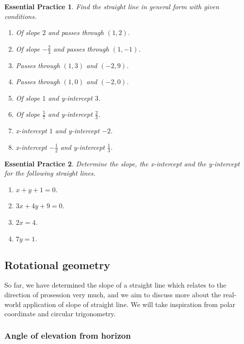 \documentclass[12pt]{article}
\newtheorem{exercise}{Essential Practice}[subsubsection]
\begin{document}
    \begin{exercise}
        Find the straight line in general form with given conditions. \begin{enumerate}
            \item Of slope $2$ and passes through $(1,2)$.
            \item Of slope $-\frac{2}{3}$ and passes through $(1,-1)$.
            \item Passes through $(1,3)$ and $(-2,9)$.
            \item Passes through $(1,0)$ and $(-2,0)$.
            \item Of slope $1$ and y-intercept $3$.
            \item Of slope $\frac{5}{7}$ and y-intercept $\frac{2}{3}$.
            \item x-intercept $1$ and y-intercept $-2$.
            \item x-intercept $-\frac{1}{2}$ and y-intercept $\frac{1}{3}$.
        \end{enumerate}
    \end{exercise}

    \begin{exercise}
        Determine the slope, the x-intercept and the y-intercept for the following straight lines.\begin{enumerate}
            \item $x+y+1=0$.
            \item $3x+4y+9=0$.
            \item $2x=4$.
            \item $7y=1$.
        \end{enumerate}
    \end{exercise}

    \subsection{Rotational geometry}

    So far, we have determined the slope of a straight line which relates to the direction of prosession very much, and we aim to discuss more about the real-world application of slope of straight line. We will take inspiration from polar coordinate and circular trigonometry.

    \subsubsection{Angle of elevation from horizon}
\end{document}
